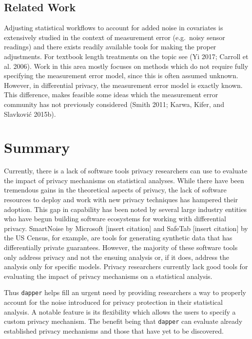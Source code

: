\hypertarget{related-work}{%
\subsection{Related Work}\label{related-work}}

Adjusting statistical workflows to account for added noise in covariates
is extensively studied in the context of measurement error (e.g.~noisy sensor readings)
and there exists readily available tools for making the proper adjustments.
For textbook length treatments on the topic see (Yi 2017; Carroll et al. 2006).
Work in this area mostly focuses on methods which do not require fully specifying the
measurement error model, since this is often assumed unknown.
However, in differential privacy, the measurement error model is exactly known.
This difference, makes feasible some ideas which the measurement
error community has not previously considered (Smith 2011; Karwa, Kifer, and Slavković 2015b).

\hypertarget{summary}{%
\section{Summary}\label{summary}}

Currently, there is a lack of software tools privacy researchers can use
to evaluate the impact of privacy mechanisms on statistical analyses.
While there have been tremendous gains in the theoretical aspects of privacy,
the lack of software resources to deploy and work with new privacy techniques has
hampered their adoption. This gap in capability has been noted by several
large industry entities who have begun building software ecosystems for
working with differential privacy. SmartNoise by Microsoft {[}insert citation{]} and SafeTab {[}insert citation{]} by the US Census, for example,
are tools for generating synthetic data that has differentially private guarantees.
However, the majority of these software tools only address privacy and not the
ensuing analysis or, if it does, address the analysis only for specific models.
Privacy researchers currently lack good tools for evaluating the impact
of privacy mechanisms on a statistical analysis.

Thus \texttt{dapper} helps fill an urgent need by providing researchers a way to properly account
for the noise introduced for privacy protection in their statistical analysis. A notable
feature is its flexibility which allows the users to specify a custom
privacy mechanism. The benefit being that \texttt{dapper} can evaluate already
established privacy mechanisms and those that have yet to be discovered.

